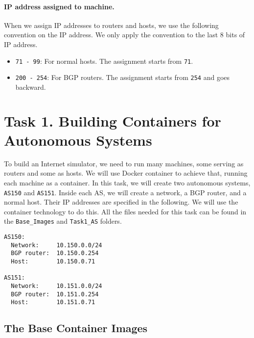 \paragraph{IP address assigned to machine.} 
When we assign IP addresses to routers and hosts, we use
the following convention on the IP address. 
We only apply the convention to the last 8 bits of IP address.

\begin{itemize}[noitemsep]
\item \texttt{71 - 99}: For normal hosts.
      The assignment starts from \texttt{71}.  

\item \texttt{200 - 254}: For BGP routers. 
   The assignment starts from \texttt{254} and goes backward. 
\end{itemize}






\section{Task 1. Building Containers for Autonomous Systems}

To build an Internet simulator, we need to run many machines,
some serving as routers and some as hosts. 
We will use Docker container to achieve that, running each
machine as a container. 
In this task, we will create two autonomous systems, \texttt{AS150} and \texttt{AS151}.  Inside
each AS, we will create a network, a BGP router, and a normal host. Their IP addresses are
specified in the following. We will use the container technology to
do this. All the files needed 
for this task can be found in the \texttt{Base\_Images} and \texttt{Task1\_AS} folders.

\begin{lstlisting}
AS150: 
  Network:     10.150.0.0/24
  BGP router:  10.150.0.254
  Host:        10.150.0.71

AS151:
  Network:     10.151.0.0/24
  BGP router:  10.151.0.254
  Host:        10.151.0.71
\end{lstlisting}


\subsection{The Base Container Images} 

